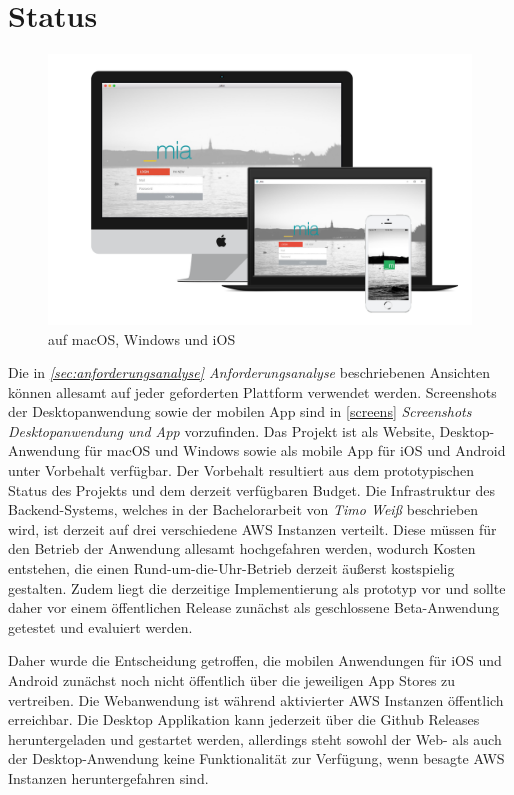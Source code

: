 \newpage

\section{Status}

\begin{figure}[h]
 \centering
  \includegraphics[width=1\linewidth]{kapitel5/showcase.png}
 \caption{\projectname{} auf macOS, Windows und iOS}
 \label{kapitel5/cross}
\end{figure}
\vspace{0.3cm}

\noindent Die in \emph{\ref{sec:anforderungsanalyse} Anforderungsanalyse} beschriebenen Ansichten können allesamt auf jeder geforderten Plattform verwendet werden.
Screenshots der Desktopanwendung sowie der mobilen App sind in \ref{screens} \emph{Screenshots Desktopanwendung und App} vorzufinden.
Das Projekt \projectname{} ist als Website, Desktop-Anwendung für macOS und Windows sowie als mobile App für iOS und Android unter Vorbehalt verfügbar.
Der Vorbehalt resultiert aus dem prototypischen Status des Projekts und dem derzeit verfügbaren Budget.
Die Infrastruktur des Backend-Systems, welches in der Bachelorarbeit von \emph{Timo Weiß} beschrieben wird,
ist derzeit auf drei verschiedene \ac{AWS} Instanzen verteilt. Diese müssen für den Betrieb der Anwendung allesamt
hochgefahren werden, wodurch Kosten entstehen, die einen Rund-um-die-Uhr-Betrieb derzeit äußerst kostspielig gestalten.
Zudem liegt die derzeitige Implementierung als prototyp vor und sollte daher vor einem
öffentlichen Release zunächst als geschlossene Beta-Anwendung getestet und evaluiert werden.

Daher wurde die Entscheidung getroffen, die mobilen Anwendungen für iOS und Android zunächst noch nicht öffentlich über die jeweiligen App Stores zu vertreiben.
Die Webanwendung ist während aktivierter \ac{AWS} Instanzen öffentlich erreichbar.
Die Desktop Applikation kann jederzeit über die Github Releases heruntergeladen und gestartet werden,
allerdings steht sowohl der Web- als auch der Desktop-Anwendung keine Funktionalität zur Verfügung, wenn besagte \ac{AWS}
Instanzen heruntergefahren sind.

